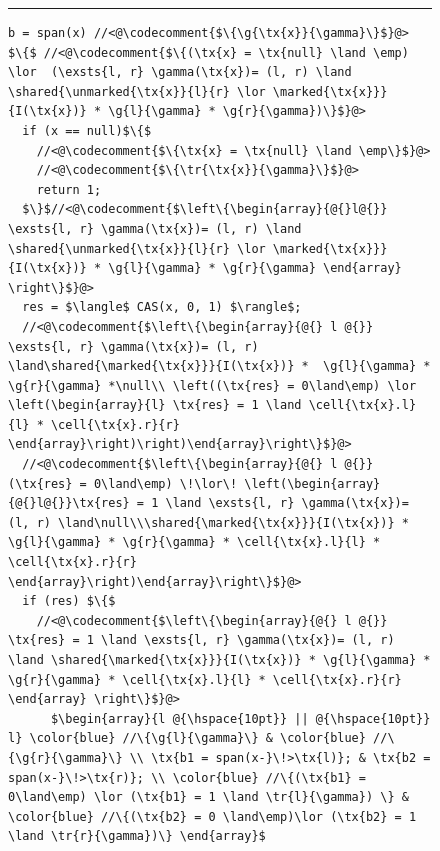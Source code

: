 \begin{figure}
\hrule    
\begin{lstlisting}
b = span(x) //<@\codecomment{$\{\g{\tx{x}}{\gamma}\}$}@>
$\{$ //<@\codecomment{$\{(\tx{x} = \tx{null} \land \emp) \lor  (\exsts{l, r} \gamma(\tx{x})= (l, r) \land \shared{\unmarked{\tx{x}}{l}{r} \lor \marked{\tx{x}}}{I(\tx{x})} * \g{l}{\gamma} * \g{r}{\gamma})\}$}@>
  if (x == null)$\{$
    //<@\codecomment{$\{\tx{x} = \tx{null} \land \emp\}$}@>
    //<@\codecomment{$\{\tr{\tx{x}}{\gamma}\}$}@>
    return 1;
  $\}$//<@\codecomment{$\left\{\begin{array}{@{}l@{}} \exsts{l, r} \gamma(\tx{x})= (l, r) \land \shared{\unmarked{\tx{x}}{l}{r} \lor \marked{\tx{x}}}{I(\tx{x})} * \g{l}{\gamma} * \g{r}{\gamma} \end{array} \right\}$}@>
  res = $\langle$ CAS(x, 0, 1) $\rangle$;
  //<@\codecomment{$\left\{\begin{array}{@{} l @{}} \exsts{l, r} \gamma(\tx{x})= (l, r) \land\shared{\marked{\tx{x}}}{I(\tx{x})} *  \g{l}{\gamma} * \g{r}{\gamma} *\null\\ \left((\tx{res} = 0\land\emp) \lor  \left(\begin{array}{l} \tx{res} = 1 \land \cell{\tx{x}.l}{l} * \cell{\tx{x}.r}{r} \end{array}\right)\right)\end{array}\right\}$}@>
  //<@\codecomment{$\left\{\begin{array}{@{} l @{}} (\tx{res} = 0\land\emp) \!\lor\! \left(\begin{array}{@{}l@{}}\tx{res} = 1 \land \exsts{l, r} \gamma(\tx{x})= (l, r) \land\null\\\shared{\marked{\tx{x}}}{I(\tx{x})} *  \g{l}{\gamma} * \g{r}{\gamma} * \cell{\tx{x}.l}{l} * \cell{\tx{x}.r}{r} \end{array}\right)\end{array}\right\}$}@>
  if (res) $\{$ 
    //<@\codecomment{$\left\{\begin{array}{@{} l @{}} \tx{res} = 1 \land \exsts{l, r} \gamma(\tx{x})= (l, r) \land \shared{\marked{\tx{x}}}{I(\tx{x})} * \g{l}{\gamma} * \g{r}{\gamma} * \cell{\tx{x}.l}{l} * \cell{\tx{x}.r}{r}    \end{array} \right\}$}@>
      $\begin{array}{l @{\hspace{10pt}} || @{\hspace{10pt}} l} \color{blue} //\{\g{l}{\gamma}\} & \color{blue} //\{\g{r}{\gamma}\} \\ \tx{b1 = span(x-}\!>\tx{l)}; & \tx{b2 = span(x-}\!>\tx{r)}; \\ \color{blue} //\{(\tx{b1} = 0\land\emp) \lor (\tx{b1} = 1 \land \tr{l}{\gamma}) \} & \color{blue} //\{(\tx{b2} = 0 \land\emp)\lor (\tx{b2} = 1 \land \tr{r}{\gamma})\} \end{array}$

\end{lstlisting}
\end{figure}
